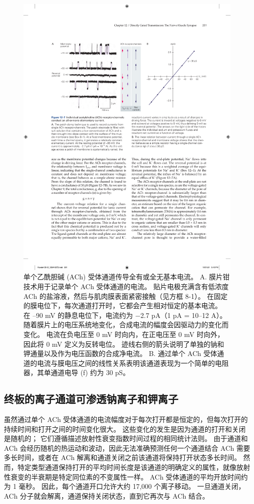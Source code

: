 \begin{figure}[htbp]
	\centering
	\includegraphics[width=0.9\linewidth]{chap12/fig_12_7}
	\caption{单个乙酰胆碱 (ACh) 受体通道传导全有或全无基本电流。 A. 膜片钳技术用于记录单个 ACh 受体通道的电流。 贴片电极充满含有低浓度 ACh 的盐溶液，然后与肌肉膜表面紧密接触（见方框 8-1）。 在固定的膜电位下，每次通道打开时，它都会产生相对恒定的基本电流。 在 –90 mV 的静息电位下，电流约为 −2.7 pA（1 pA = 10–12 A）。 随着膜片上的电压系统地变化，合成电流的幅度会因驱动力的变化而变化。 电流在负电压至 0 mV 时向内，在正电压至 0 mV 时向外，因此将 0 mV 定义为反转电位。 迹线右侧的箭头说明了单独的钠和钾通量以及作为电压函数的合成净电流。 B. 通过单个 ACh 受体通道的电流与膜电压之间的线性关系表明该通道表现为一个简单的电阻器，其单通道电导 (f) 约为 30 pS。}
	\label{fig:12_7}
\end{figure}




\subsection{终板的离子通道可渗透钠离子和钾离子}
虽然通过单个 ACh 受体通道的电流幅度对于每次打开都是恒定的，但每次打开的持续时间和打开之间的时间变化很大。 
这些变化的发生是因为通道的打开和关闭是随机的； 
它们遵循描述放射性衰变指数时间过程的相同统计法则。 
由于通道和 ACh 会经历随机的热运动和波动，因此无法准确预测任何一个通道结合 ACh 需要多长时间，或者在 ACh 解离和通道关闭之前该通道将保持打开状态多长时间。 
然而，特定类型通道保持打开的平均时间长度是该通道的明确定义的属性，就像放射性衰变的半衰期是特定同位素的不变属性一样。 ACh 受体通道的平均开放时间约为 1 毫秒。 
因此，每个通道开口允许大约 17,000 个离子移动。 
一旦通道关闭，ACh 分子就会解离，通道保持关闭状态，直到它再次与 ACh 结合。


